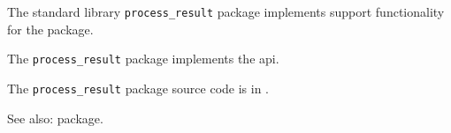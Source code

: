 
The standard library {\tt process\_result} package implements support functionality for the  package.

The {\tt process\_result} package implements the  api.

The {\tt process\_result} package source code is in .

See also:  package.

